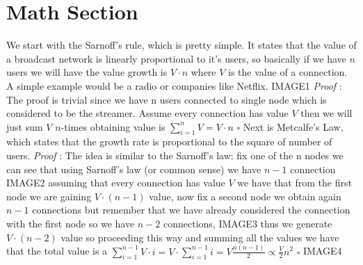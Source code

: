 \documentclass[12pt, a4page]{article}
\begin{document}
\part*{Math Section}
We start with the Sarnoff's rule, which is pretty simple. It states that the value of a broadcast network is linearly proportional to it's users, so basically if we have $n$ users we will have the value growth is $V \cdot n$ where $V$ is the value of a connection. A simple example would be a radio or companies like Netflix.
\newline IMAGE1 \newline
\textit{Proof} : The proof is trivial since we have n users connected to single node which is considered to be the streamer. Assume every connection has value $V$ then we will just sum $V$ $n$-times obtaining value is $\sum_{i=1}^{n} V = V \cdot n$ \hfill $\square$
\newline
\newline
Next is Metcalfe's Law, which states that the growth rate is proportional to the square of number of users.\newline
\textit{Proof} : The idea is similar to the Sarnoff's law: fix one of the n nodes we can see that using Sarnoff's law (or common sense) we have $n-1$ connection
IMAGE2 \newline
assuming that every connection has value $V$ we have that from the first node we are gaining $V \cdot (n - 1)$ value, now fix a second node we obtain again $n-1$ connections but remember that we have already considered the connection with the first node so we have $n-2$ connections,\newline
IMAGE3 \newline
thus we generate $V \cdot (n - 2)$ value so proceeding this way and summing all the values we have that the total value is a $\sum_{i=1}^{n-1} V \cdot i = V \cdot \sum_{i=1}^{n-1} i = V \frac{n(n-1)}{2} \propto \frac{V}{2} n^2$  \hfill $\square$
\newline IMAGE4 \newline
\end{document}
